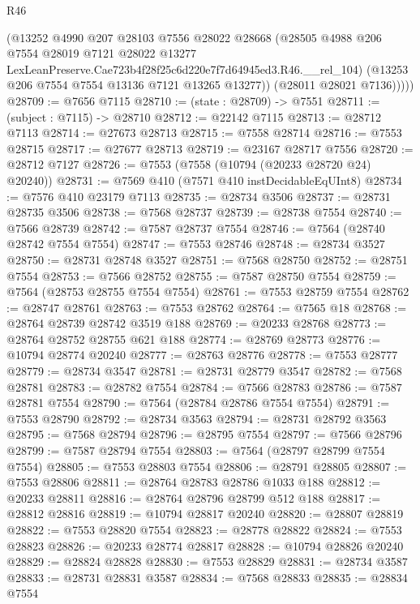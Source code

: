 \begin{lexlean}{R46}
\begin{coremodule}
            (@13252
              @4990
              @207
              @28103
              @7556
              @28022
              @28668
              (@28505
                @4988
                @206
                @7554
                @28019
                @7121
                @28022
                @13277
                LexLeanPreserve.Cae723b4f28f25c6d220e7f7d64945ed3.R46.__rel_104)
              (@13253 @206 @7554 @7554 @13136 @7121 @13265 @13277))
            (@28011 @28021 @7136)))))
@28709 := @7656 @7115
@28710 := (state : @28709) -> @7551
@28711 := (subject : @7115) -> @28710
@28712 := @22142 @7115
@28713 := @28712 @7113
@28714 := @27673 @28713
@28715 := @7558 @28714
@28716 := @7553 @28715
@28717 := @27677 @28713
@28719 := @23167 @28717 @7556
@28720 := @28712 @7127
@28726 := @7553 (@7558 (@10794 (@20233 @28720 @24) @20240))
@28731 := @7569 @410 (@7571 @410 instDecidableEqUInt8)
@28734 := @7576 @410 @23179 @7113
@28735 := @28734 @3506
@28737 := @28731 @28735 @3506
@28738 := @7568 @28737
@28739 := @28738 @7554
@28740 := @7566 @28739
@28742 := @7587 @28737 @7554
@28746 := @7564 (@28740 @28742 @7554 @7554)
@28747 := @7553 @28746
@28748 := @28734 @3527
@28750 := @28731 @28748 @3527
@28751 := @7568 @28750
@28752 := @28751 @7554
@28753 := @7566 @28752
@28755 := @7587 @28750 @7554
@28759 := @7564 (@28753 @28755 @7554 @7554)
@28761 := @7553 @28759 @7554
@28762 := @28747 @28761
@28763 := @7553 @28762
@28764 := @7565 @18
@28768 := @28764 @28739 @28742 @3519 @188
@28769 := @20233 @28768
@28773 := @28764 @28752 @28755 @621 @188
@28774 := @28769 @28773
@28776 := @10794 @28774 @20240
@28777 := @28763 @28776
@28778 := @7553 @28777
@28779 := @28734 @3547
@28781 := @28731 @28779 @3547
@28782 := @7568 @28781
@28783 := @28782 @7554
@28784 := @7566 @28783
@28786 := @7587 @28781 @7554
@28790 := @7564 (@28784 @28786 @7554 @7554)
@28791 := @7553 @28790
@28792 := @28734 @3563
@28794 := @28731 @28792 @3563
@28795 := @7568 @28794
@28796 := @28795 @7554
@28797 := @7566 @28796
@28799 := @7587 @28794 @7554
@28803 := @7564 (@28797 @28799 @7554 @7554)
@28805 := @7553 @28803 @7554
@28806 := @28791 @28805
@28807 := @7553 @28806
@28811 := @28764 @28783 @28786 @1033 @188
@28812 := @20233 @28811
@28816 := @28764 @28796 @28799 @512 @188
@28817 := @28812 @28816
@28819 := @10794 @28817 @20240
@28820 := @28807 @28819
@28822 := @7553 @28820 @7554
@28823 := @28778 @28822
@28824 := @7553 @28823
@28826 := @20233 @28774 @28817
@28828 := @10794 @28826 @20240
@28829 := @28824 @28828
@28830 := @7553 @28829
@28831 := @28734 @3587
@28833 := @28731 @28831 @3587
@28834 := @7568 @28833
@28835 := @28834 @7554

\end{coremodule}
\end{lexlean}
